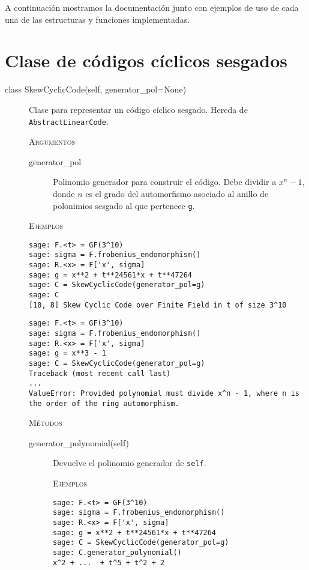 A continuación mostramos la documentación junto con ejemplos de uso de cada una de las estructuras y funciones implementadas.

\newpage
\section{Clase de códigos cíclicos sesgados}%
\label{sec:clase_de_códigos_cíclicos_sesgados}

\begin{description}
    \item[class SkewCyclicCode(self, generator\_pol=None)]
    Clase para representar un código cíclico sesgado. Hereda de \texttt{AbstractLinearCode}.

    \textsc{Argumentos}
    \begin{description}
        \item[generator\_pol] Polinomio generador para construir el código. Debe dividir a \(x^{n} -1\), donde \(n\) es el grado del automorfismo asociado al anillo de polonimios sesgado al que pertenece \texttt{g}.
    \end{description}

    \textsc{Ejemplos}
    \begin{lstlisting}
sage: F.<t> = GF(3^10)
sage: sigma = F.frobenius_endomorphism()
sage: R.<x> = F['x', sigma]
sage: g = x**2 + t**24561*x + t**47264
sage: C = SkewCyclicCode(generator_pol=g)
sage: C
[10, 8] Skew Cyclic Code over Finite Field in t of size 3^10
    \end{lstlisting}

    \begin{lstlisting}
sage: F.<t> = GF(3^10)
sage: sigma = F.frobenius_endomorphism()
sage: R.<x> = F['x', sigma]
sage: g = x**3 - 1
sage: C = SkewCyclicCode(generator_pol=g)
Traceback (most recent call last)
...
ValueError: Provided polynomial must divide x^n - 1, where n is the order of the ring automorphism.
    \end{lstlisting}

    \textsc{Métodos}
    \begin{description}
    \item[generator\_polynomial(self)]
    Devuelve el polinomio generador de \texttt{self}.

    \textsc{Ejemplos}
    \begin{lstlisting}
sage: F.<t> = GF(3^10)
sage: sigma = F.frobenius_endomorphism()
sage: R.<x> = F['x', sigma]
sage: g = x**2 + t**24561*x + t**47264
sage: C = SkewCyclicCode(generator_pol=g)
sage: C.generator_polynomial()
x^2 + ...  + t^5 + t^2 + 2
    \end{lstlisting}


\end{description}
\end{description}
